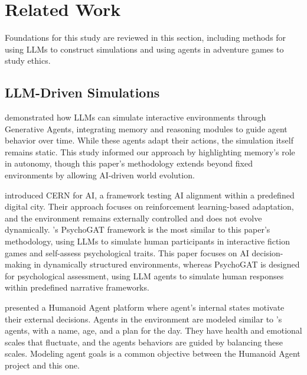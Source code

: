 \section{Related Work}
\vspace{-0.5ex}

Foundations for this study are reviewed in this section, including methods for using LLMs to construct simulations and using agents in adventure games to study ethics.

\subsection{LLM-Driven Simulations}
\citeauthor{park2023generativeagentsinteractivesimulacra} demonstrated how LLMs can simulate interactive environments through Generative Agents, integrating memory and reasoning modules to guide agent behavior over time. While these agents adapt their actions, the simulation itself remains static. This study informed our approach by highlighting memory’s role in autonomy, though this paper's methodology extends beyond fixed environments by allowing AI-driven world evolution.

\citeauthor{bojic_cern_2024} introduced CERN for AI, a framework testing AI alignment within a predefined digital city. Their approach focuses on reinforcement learning-based adaptation, and the environment remains externally controlled and does not evolve dynamically. \citeauthor{yang2024psychogatnovelpsychologicalmeasurement}’s PsychoGAT framework is the most similar to this paper's methodology, using LLMs to simulate human participants in interactive fiction games and self-assess psychological traits. This paper focuses on AI decision-making in dynamically structured environments, whereas PsychoGAT is designed for psychological assessment, using LLM agents to simulate human responses within predefined narrative frameworks.

\citeauthor{wang2023humanoidagentsplatformsimulating} presented a Humanoid Agent platform where agent's internal states motivate their external decisions. Agents in the environment are modeled similar to \citeauthor{park2023generativeagentsinteractivesimulacra}'s agents, with a name, age, and a plan for the day. They have health and emotional scales that fluctuate, and the agents behaviors are guided by balancing these scales. Modeling agent goals is a common objective between the Humanoid Agent project and this one.


